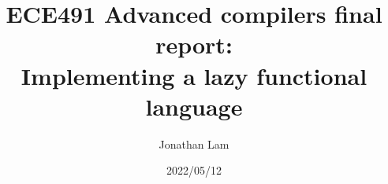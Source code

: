 \documentclass{article}
\title{
  ECE491 Advanced compilers final report: \\
  Implementing a lazy functional language
}
\author{Jonathan Lam}
\date{2022/05/12}
\begin{document}
\maketitle{}

\tableofcontents{}










\appendix{}

\end{document}
